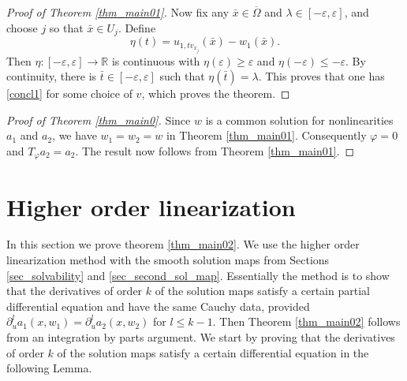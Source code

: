 \documentclass[11pt,a4paper]{amsart}
\theoremstyle{definition}
\numberwithin{equation}{section}
\newcommand{\mR}{\mathbb{R}}                    %
\newcommand{\ol}[1]{\overline{#1}}
\newcommand{\eps}{\varepsilon}
\newcommand{\Om}{\Omega}
\begin{document}
\begin{proof}[Proof of Theorem \ref{thm_main01}]
Now fix any $\bar{x} \in \ol{\Om}$ and $\lambda \in [-\eps,\eps]$, and choose $j$ so that $\bar{x} \in U_j$. Define 
\[
\eta(t) = u_{1,tv_{x_j}}(\bar{x}) - w_1(\bar{x}).
\]
Then $\eta: [-\eps, \eps] \to \mR$ is continuous with $\eta(\eps) \geq \eps$ and $\eta(-\eps) \leq -\eps$. By continuity, there is $\bar{t} \in [-\eps,\eps]$ such that $\eta(\bar{t}) = \lambda$. This proves that one has \eqref{concl1} for some choice of $v$, which proves the theorem.
\end{proof}


\begin{proof}[Proof of Theorem \ref{thm_main0}]
Since $w$ is a common solution for nonlinearities $a_1$ and $a_2$, we have $w_1=w_2=w$ in Theorem \ref{thm_main01}. Consequently $\varphi=0$ and $T_{\varphi} a_2 = a_2$. The result now follows from Theorem \ref{thm_main01}.
\end{proof}




\section{Higher order linearization}\label{sec_proofs_main}


In this section we prove theorem \ref{thm_main02}.
We use the higher order linearization method with the smooth solution maps from Sections \ref{sec_solvability} and \ref{sec_second_sol_map}.
Essentially the method is to show that the derivatives of order \( k \) of the solution maps satisfy a certain partial differential equation and have the same Cauchy data, provided \( \partial_{u}^{l}a_{1}(x,w_{1})=\partial_{u}^{l}a_{2}(x,w_{2}) \) for \( l\leq k-1 \).
Then Theorem \ref{thm_main02} follows from an integration by parts argument.
We start by proving that the derivatives of order \( k \) of the solution maps satisfy a certain differential equation in the following Lemma.
\end{document}
